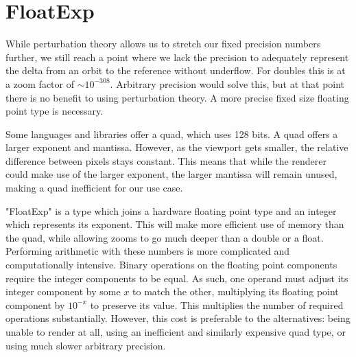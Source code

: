 \documentclass{article}
\begin{document}
\section{FloatExp}
\par While perturbation theory allows us to stretch our fixed precision numbers further, we still reach a point where we lack the precision to adequately represent the delta from an orbit to the reference without underflow. For doubles this is at a zoom factor of $\sim 10^{-308}$. Arbitrary precision would solve this, but at that point there is no benefit to using perturbation theory. A more precise fixed size floating point type is necessary.
\par Some languages and libraries offer a quad, which uses 128 bits. A quad offers a larger exponent and mantissa. However, as the viewport gets smaller, the relative difference between pixels stays constant. This means that while the renderer could make use of the larger exponent, the larger mantissa will remain unused, making a quad inefficient for our use case.
\par "FloatExp" is a type which joins a hardware floating point type and an integer which represents its exponent. This will make more efficient use of memory than the quad, while allowing zooms to go much deeper than a double or a float. Performing arithmetic with these numbers is more complicated and computationally intensive. Binary operations on the floating point components require the integer components to be equal. As such, one operand must adjust its integer component by some $x$ to match the other, multiplying its floating point component by $10^{-x}$ to preserve its value. This multiplies the number of required operations substantially. However, this cost is preferable to the alternatives: being unable to render at all, using an inefficient and similarly expensive quad type, or using much slower arbitrary precision.\cite{UnknownFloatExp}
\end{document}
